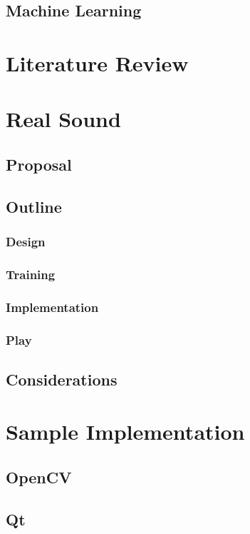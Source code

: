 \documentclass{report}
\begin{document}
\section{Machine Learning}


\chapter{Literature Review} 


\chapter{Real Sound}
\section{Proposal} 
\section{Outline}
\subsection{Design}
\subsection{Training}
\subsection{Implementation}
\subsection{Play}
\section{Considerations}



\chapter{Sample Implementation}
\section{OpenCV}
\section{Qt}
\end{document}
